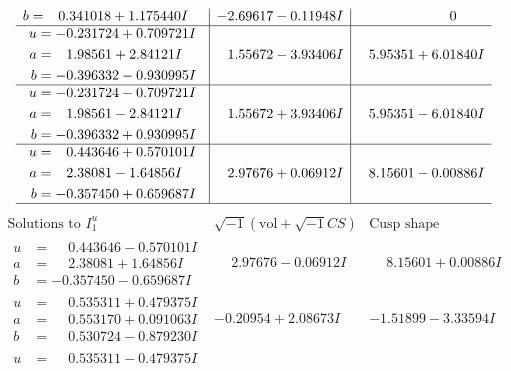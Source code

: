 \documentclass[1p]{elsarticle_modified}
\theoremstyle{definition}
\newcommand{\I}{\sqrt{-1}}
\begin{document}
$$\begin{array}{c|c|c}
\begin{aligned}
b &= \phantom{-}0.341018 + 1.175440 I\end{aligned}
 & -2.69617 - 0.11948 I & \phantom{-0.000000 } 0 \\ \hline\begin{aligned}
u &= -0.231724 + 0.709721 I \\
a &= \phantom{-}1.98561 + 2.84121 I \\
b &= -0.396332 - 0.930995 I\end{aligned}
 & \phantom{-}1.55672 - 3.93406 I & \phantom{-}5.95351 + 6.01840 I \\ \hline\begin{aligned}
u &= -0.231724 - 0.709721 I \\
a &= \phantom{-}1.98561 - 2.84121 I \\
b &= -0.396332 + 0.930995 I\end{aligned}
 & \phantom{-}1.55672 + 3.93406 I & \phantom{-}5.95351 - 6.01840 I \\ \hline\begin{aligned}
u &= \phantom{-}0.443646 + 0.570101 I \\
a &= \phantom{-}2.38081 - 1.64856 I \\
b &= -0.357450 + 0.659687 I\end{aligned}
 & \phantom{-}2.97676 + 0.06912 I & \phantom{-}8.15601 - 0.00886 I\\
 \hline 
 \end{array}$$\newpage$$\begin{array}{c|c|c}  
\text{Solutions to }I^u_{1}& \I (\text{vol} + \sqrt{-1}CS) & \text{Cusp shape}\\
 \hline 
\begin{aligned}
u &= \phantom{-}0.443646 - 0.570101 I \\
a &= \phantom{-}2.38081 + 1.64856 I \\
b &= -0.357450 - 0.659687 I\end{aligned}
 & \phantom{-}2.97676 - 0.06912 I & \phantom{-}8.15601 + 0.00886 I \\ \hline\begin{aligned}
u &= \phantom{-}0.535311 + 0.479375 I \\
a &= \phantom{-}0.553170 + 0.091063 I \\
b &= \phantom{-}0.530724 - 0.879230 I\end{aligned}
 & -0.20954 + 2.08673 I & -1.51899 - 3.33594 I \\ \hline\begin{aligned}
u &= \phantom{-}0.535311 - 0.479375 I \\

\end{aligned}
\end{array}$$
\end{document}
